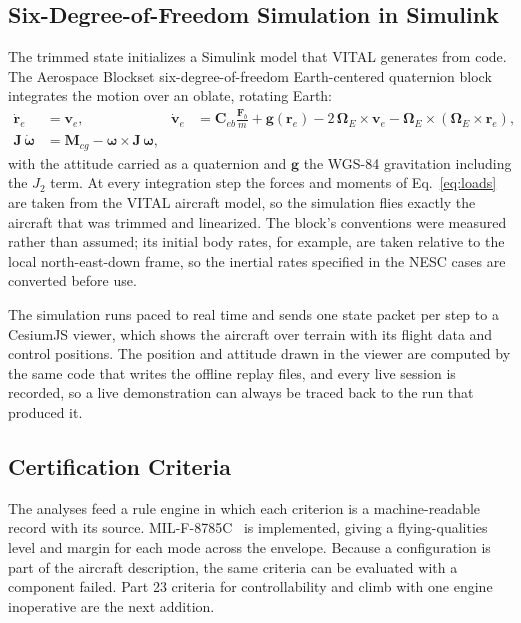\documentclass[conf]{new-aiaa}
\newcommand{\vect}[1]{\mathbf{#1}}
\begin{document}
\subsection{Six-Degree-of-Freedom Simulation in Simulink}
The trimmed state initializes a Simulink model that VITAL generates from code. The Aerospace
Blockset six-degree-of-freedom Earth-centered quaternion block integrates the motion over an
oblate, rotating Earth:
\begin{equation}
\label{eq:eom}
\begin{aligned}
\dot{\vect{r}}_e &= \vect{v}_e, &
\dot{\vect{v}}_e &= \vect{C}_{eb}\frac{\vect{F}_b}{m} + \vect{g}(\vect{r}_e)
  - 2\,\boldsymbol{\Omega}_E \times \vect{v}_e
  - \boldsymbol{\Omega}_E \times \left(\boldsymbol{\Omega}_E \times \vect{r}_e\right), \\
\vect{J}\,\dot{\boldsymbol{\omega}} &= \vect{M}_{cg} - \boldsymbol{\omega} \times \vect{J}\,\boldsymbol{\omega},
\end{aligned}
\end{equation}
with the attitude carried as a quaternion and $\vect{g}$ the WGS-84 gravitation including the
$J_2$ term. At every integration step the forces and moments of Eq.~\eqref{eq:loads} are taken
from the VITAL aircraft model, so the simulation flies exactly the aircraft that was trimmed
and linearized. The block's conventions were measured rather than assumed; its initial body
rates, for example, are taken relative to the local north-east-down frame, so the inertial
rates specified in the NESC cases are converted before use.

The simulation runs paced to real time and sends one state packet per step to a CesiumJS
viewer, which shows the aircraft over terrain with its flight data and control positions. The
position and attitude drawn in the viewer are computed by the same code that writes the offline
replay files, and every live session is recorded, so a live demonstration can always be traced
back to the run that produced it.

\subsection{Certification Criteria}
The analyses feed a rule engine in which each criterion is a machine-readable record with
its source. MIL-F-8785C~\cite{mil8785c} is implemented, giving a flying-qualities level and
margin for each mode across the envelope. Because a configuration is part of the aircraft
description, the same criteria can be evaluated with a component failed. Part 23 criteria for controllability and climb with one engine inoperative
are the next addition.
\end{document}
